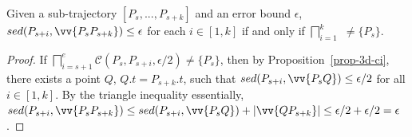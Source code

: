 \begin{prop}
\label{prop-3d-ci-half}
Given a sub-trajectory $[P_s,...,P_{s+k}]$ and an error bound $\epsilon$, $sed(P_{s+i}, \vv{P_sP_{s+k}})\le \epsilon$ for each $i \in [1,k]$ if and only if $\bigsqcap_{i=1}^{k}$ $\ne \{P_s\}$.
\end{prop}


\begin{proof}
If $\bigsqcap_{i=s+1}^{e}{\mathcal{C}(P_s, P_{s+i}, \epsilon/2)} \ne \{P_s\}$, then by Proposition~\ref{prop-3d-ci}, there exists a point $Q$, $Q.t = P_{s+k}.t$, such that $sed(P_{s+i}, \vv{P_sQ})\le \epsilon/2$ for all $i \in [1,k]$. By the triangle inequality essentially, $sed(P_{s+i}, \vv{P_sP_{s+k}})\le  sed(P_{s+i}, \vv{P_sQ}) + |\vv{QP_{s+k}}| \le  \epsilon/2+\epsilon/2 = \epsilon$.
\end{proof}




